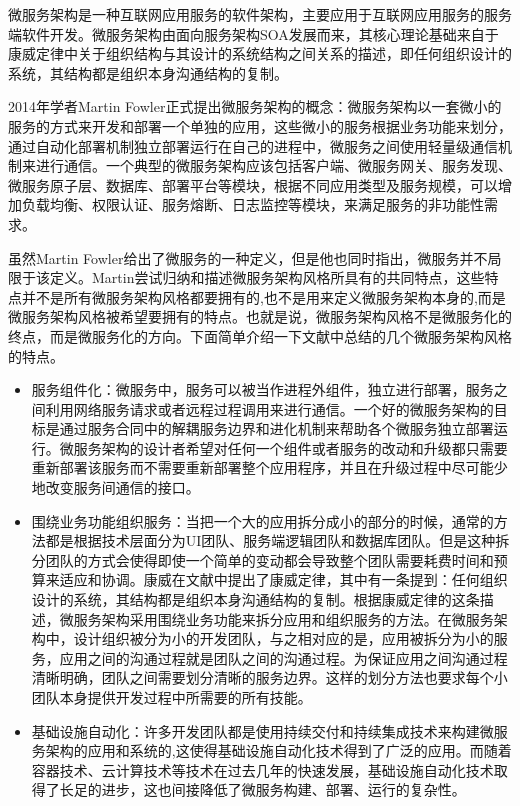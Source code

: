 微服务架构是一种互联网应用服务的软件架构，主要应用于互联网应用服务的服务端软件开发。微服务架构由面向服务架构SOA发展而来，其核心理论基础来自于康威定律\cite{conway1968committees}中关于组织结构与其设计的系统结构之间关系的描述，即任何组织设计的系统，其结构都是组织本身沟通结构的复制。

2014年学者Martin Fowler正式提出微服务架构的概念\cite{lewis2014microservices}：微服务架构以一套微小的服务的方式来开发和部署一个单独的应用，这些微小的服务根据业务功能来划分，通过自动化部署机制独立部署运行在自己的进程中，微服务之间使用轻量级通信机制来进行通信。一个典型的微服务架构应该包括客户端、微服务网关、服务发现、微服务原子层、数据库、部署平台等模块，根据不同应用类型及服务规模，可以增加负载均衡、权限认证、服务熔断、日志监控等模块，来满足服务的非功能性需求。

虽然Martin Fowler给出了微服务的一种定义，但是他也同时指出，微服务并不局限于该定义。Martin尝试归纳和描述微服务架构风格所具有的共同特点，这些特点并不是所有微服务架构风格都要拥有的,也不是用来定义微服务架构本身的,而是微服务架构风格被希望要拥有的特点。也就是说，微服务架构风格不是微服务化的终点，而是微服务化的方向。下面简单介绍一下文献\cite{lewis2014microservices}中总结的几个微服务架构风格的特点。

\begin{itemize}
    \item 服务组件化：微服务中，服务可以被当作进程外组件，独立进行部署，服务之间利用网络服务请求或者远程过程调用来进行通信。一个好的微服务架构的目标是通过服务合同中的解耦服务边界和进化机制来帮助各个微服务独立部署运行。微服务架构的设计者希望对任何一个组件或者服务的改动和升级都只需要重新部署该服务而不需要重新部署整个应用程序，并且在升级过程中尽可能少地改变服务间通信的接口。
    \item 围绕业务功能组织服务：当把一个大的应用拆分成小的部分的时候，通常的方法都是根据技术层面分为UI团队、服务端逻辑团队和数据库团队。但是这种拆分团队的方式会使得即使一个简单的变动都会导致整个团队需要耗费时间和预算来适应和协调。康威在文献\cite{conway1968committees}中提出了康威定律，其中有一条提到：任何组织设计的系统，其结构都是组织本身沟通结构的复制。根据康威定律的这条描述，微服务架构采用围绕业务功能来拆分应用和组织服务的方法。在微服务架构中，设计组织被分为小的开发团队，与之相对应的是，应用被拆分为小的服务，应用之间的沟通过程就是团队之间的沟通过程。为保证应用之间沟通过程清晰明确，团队之间需要划分清晰的服务边界。这样的划分方法也要求每个小团队本身提供开发过程中所需要的所有技能。
    \item 基础设施自动化：许多开发团队都是使用持续交付和持续集成技术来构建微服务架构的应用和系统的,这使得基础设施自动化技术得到了广泛的应用。而随着容器技术、云计算技术等技术在过去几年的快速发展，基础设施自动化技术取得了长足的进步，这也间接降低了微服务构建、部署、运行的复杂性。

\end{itemize}

